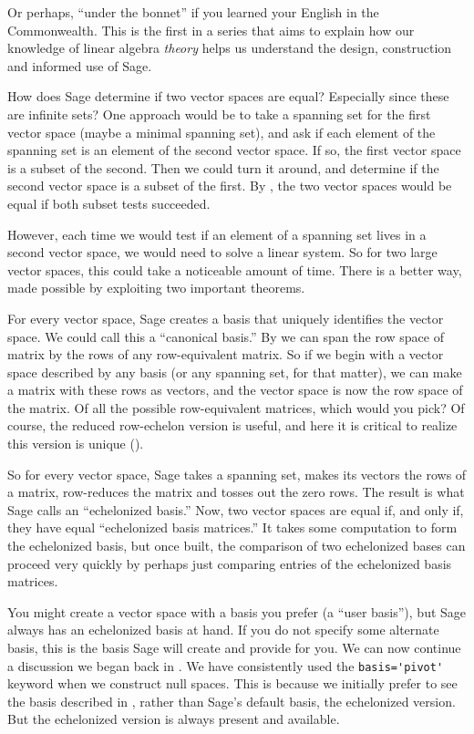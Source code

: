Or perhaps, ``under the bonnet'' if you learned your English in the Commonwealth.  This is the first in a series that aims to explain how our knowledge of linear algebra \emph{theory} helps us understand the design, construction and informed use of Sage.\par
%
How does Sage determine if two vector spaces are equal?  Especially since these are infinite sets?  One approach would be to take a spanning set for the first vector space (maybe a minimal spanning set), and ask if each element of the spanning set is an element of the second vector space.  If so, the first vector space is a subset of the second.  Then we could turn it around, and determine if the second vector space is a subset of the first.  By , the two vector spaces would be equal if both subset tests succeeded.\par
%
However, each time we would test if an element of a spanning set lives in a second vector space, we would need to solve a linear system.  So for two large vector spaces, this could take a noticeable amount of time.  There is a better way, made possible by exploiting two important theorems.\par
%
For every vector space, Sage creates a basis that uniquely identifies the vector space.  We could call this a ``canonical basis.''  By  we can span the row space of matrix by the rows of any row-equivalent matrix.  So if we begin with a vector space described by any basis (or any spanning set, for that matter), we can make a matrix with these rows as vectors, and the vector space is now the row space of the matrix.  Of all the possible row-equivalent matrices, which would you pick?  Of course, the reduced row-echelon version is useful, and here it is critical to realize this version is unique ().\par
%
So for every vector space, Sage takes a spanning set, makes its vectors the rows of a matrix, row-reduces the matrix and tosses out the zero rows.  The result is what Sage calls an ``echelonized basis.''  Now, two vector spaces are equal if, and only if, they have equal ``echelonized basis matrices.''  It takes some computation to form the echelonized basis, but once built, the comparison of two echelonized bases can proceed very quickly by perhaps just comparing entries of the echelonized basis matrices.\par
%
You might create a vector space with a basis you prefer (a ``user basis''), but Sage always has an echelonized basis at hand.  If you do not specify some alternate basis, this is the basis Sage will create and provide for you.  We can now continue a discussion we began back in .  We have consistently used the \verb?basis='pivot'? keyword when we construct null spaces.  This is because we initially prefer to see the basis described in , rather than Sage's default basis, the echelonized version.  But the echelonized version is always present and available.
